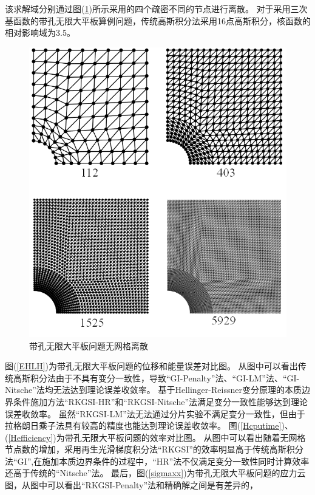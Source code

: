 该求解域分别通过图(\ref{hole.mesh})所示采用的四个疏密不同的节点进行离散。
对于采用三次基函数的带孔无限大平板算例问题，传统高斯积分法采用16点高斯积分，核函数的相对影响域为3.5。\par
\begin{figure}[H]
\centering
 \includegraphics[scale=0.8]{figure/EHR/hole/hole.mesh.png}
   \caption{带孔无限大平板问题无网格离散}\label{hole.mesh}
\end{figure}
图(\ref{EHLH})为带孔无限大平板问题的位移和能量误差对比图。
从图中可以看出传统高斯积分法由于不具有变分一致性，导致“GI-Penalty”法、“GI-LM”法、“GI-Nitsche”法均无法达到理论误差收敛率。
基于Hellinger-Reissner变分原理的本质边界条件施加方法“RKGSI-HR”和“RKGSI-Nitsche”法满足变分一致性能够达到理论误差收敛率。
虽然“RKGSI-LM”法无法通过分片实验不满足变分一致性，但由于拉格朗日乘子法具有较高的精度也能达到理论误差收敛率。
图(\ref{Hcputime})、(\ref{Hefficiency})为带孔无限大平板问题的效率对比图。
从图中可以看出随着无网格节点数的增加，采用再生光滑梯度积分法“RKGSI”的效率明显高于传统高斯积分法“GI”,在施加本质边界条件的过程中，“HR”法不仅满足变分一致性同时计算效率还高于传统的“Nitsche”法。
最后，图(\ref{sigmaxx})为带孔无限大平板问题的应力云图，从图中可以看出“RKGSI-Penalty”法和精确解之间是有差异的，
